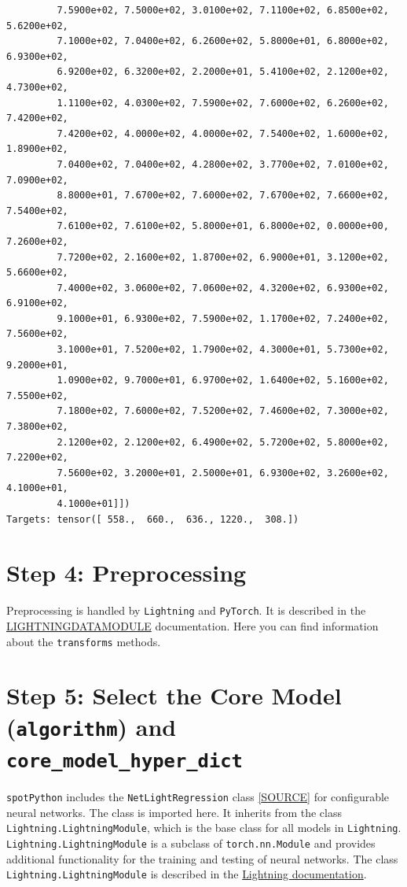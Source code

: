 \documentclass[
  letterpaper,
  DIV=11,
  numbers=noendperiod]{scrreprt}
\begin{document}
\begin{tcolorbox}
\begin{verbatim}
         7.5900e+02, 7.5000e+02, 3.0100e+02, 7.1100e+02, 6.8500e+02, 5.6200e+02,
         7.1000e+02, 7.0400e+02, 6.2600e+02, 5.8000e+01, 6.8000e+02, 6.9300e+02,
         6.9200e+02, 6.3200e+02, 2.2000e+01, 5.4100e+02, 2.1200e+02, 4.7300e+02,
         1.1100e+02, 4.0300e+02, 7.5900e+02, 7.6000e+02, 6.2600e+02, 7.4200e+02,
         7.4200e+02, 4.0000e+02, 4.0000e+02, 7.5400e+02, 1.6000e+02, 1.8900e+02,
         7.0400e+02, 7.0400e+02, 4.2800e+02, 3.7700e+02, 7.0100e+02, 7.0900e+02,
         8.8000e+01, 7.6700e+02, 7.6000e+02, 7.6700e+02, 7.6600e+02, 7.5400e+02,
         7.6100e+02, 7.6100e+02, 5.8000e+01, 6.8000e+02, 0.0000e+00, 7.2600e+02,
         7.7200e+02, 2.1600e+02, 1.8700e+02, 6.9000e+01, 3.1200e+02, 5.6600e+02,
         7.4000e+02, 3.0600e+02, 7.0600e+02, 4.3200e+02, 6.9300e+02, 6.9100e+02,
         9.1000e+01, 6.9300e+02, 7.5900e+02, 1.1700e+02, 7.2400e+02, 7.5600e+02,
         3.1000e+01, 7.5200e+02, 1.7900e+02, 4.3000e+01, 5.7300e+02, 9.2000e+01,
         1.0900e+02, 9.7000e+01, 6.9700e+02, 1.6400e+02, 5.1600e+02, 7.5500e+02,
         7.1800e+02, 7.6000e+02, 7.5200e+02, 7.4600e+02, 7.3000e+02, 7.3800e+02,
         2.1200e+02, 2.1200e+02, 6.4900e+02, 5.7200e+02, 5.8000e+02, 7.2200e+02,
         7.5600e+02, 3.2000e+01, 2.5000e+01, 6.9300e+02, 3.2600e+02, 4.1000e+01,
         4.1000e+01]])
Targets: tensor([ 558.,  660.,  636., 1220.,  308.])
\end{verbatim}

\end{tcolorbox}

\section{Step 4: Preprocessing}\label{sec-preprocessing-31}

Preprocessing is handled by \texttt{Lightning} and \texttt{PyTorch}. It
is described in the
\href{https://lightning.ai/docs/pytorch/stable/data/datamodule.html}{LIGHTNINGDATAMODULE}
documentation. Here you can find information about the
\texttt{transforms} methods.

\section{\texorpdfstring{Step 5: Select the Core Model
(\texttt{algorithm}) and
\texttt{core\_model\_hyper\_dict}}{Step 5: Select the Core Model (algorithm) and core\_model\_hyper\_dict}}\label{sec-selection-of-the-algorithm-31}

\texttt{spotPython} includes the \texttt{NetLightRegression} class
\href{https://github.com/sequential-parameter-optimization/spotPython/blob/main/src/spotPython/light/netlightregression.py}{{[}SOURCE{]}}
for configurable neural networks. The class is imported here. It
inherits from the class \texttt{Lightning.LightningModule}, which is the
base class for all models in \texttt{Lightning}.
\texttt{Lightning.LightningModule} is a subclass of
\texttt{torch.nn.Module} and provides additional functionality for the
training and testing of neural networks. The class
\texttt{Lightning.LightningModule} is described in the
\href{https://lightning.ai/docs/pytorch/stable/common/lightning_module.html}{Lightning
documentation}.
\end{document}
